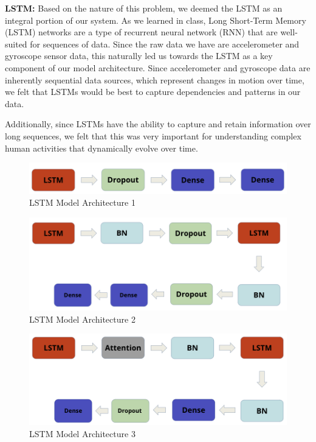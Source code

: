\documentclass[conference]{IEEEtran}
\begin{document}
\textbf{LSTM:} Based on the nature of this problem, we deemed the LSTM as an integral portion of our system. As we learned in class, Long Short-Term Memory (LSTM) networks are a type of recurrent neural network (RNN) that are well-suited for sequences of data. Since the raw data we have are accelerometer and gyroscope sensor data, this naturally led us towards the LSTM as a key component of our model architecture. Since accelerometer and gyroscope data are inherently sequential data sources, which represent changes in motion over time, we felt that LSTMs would be best to capture dependencies and patterns in our data. 

Additionally, since LSTMs have the ability to capture and retain information over long sequences, we felt that this was very important for understanding complex human activities that dynamically evolve over time.


\begin{figure}[h!]
	\includegraphics[width= 0.9 \linewidth]{LSTM(1).png}
	\centering
	\caption{LSTM Model Architecture 1}
	\label{LSTM(1).png}
\end{figure}

\begin{figure}[h!]
	\includegraphics[width= 0.9 \linewidth]{LSTM(2).png}
	\centering
	\caption{LSTM Model Architecture 2}
	\label{LSTM(2).png}
\end{figure}


\begin{figure}[h!]
	\includegraphics[width= 0.9 \linewidth]{LSTM(3).png}
	\centering
	\caption{LSTM Model Architecture 3}
	\label{LSTM(3).png}
\end{figure}
\end{document}

